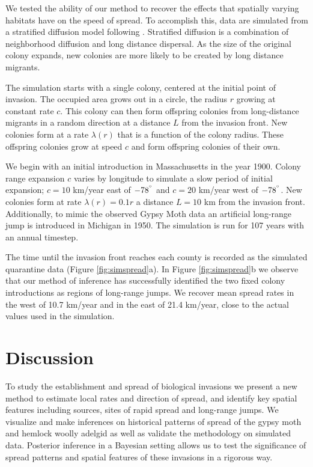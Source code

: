 \documentclass[12pt]{article}
\begin{document}
We tested the ability of our method to recover the effects that spatially varying habitats have on the speed of spread. To accomplish this, data are simulated from a stratified diffusion model following \cite{shigesada1995}. Stratified diffusion is a combination of neighborhood diffusion and long distance dispersal. As the size of the original colony expands, new colonies are more likely to be created by long distance migrants.

The simulation starts with a single colony, centered at the initial point of invasion. The occupied area grows out in a circle, the radius $r$ growing at constant rate $c$. This colony can then form offspring colonies from long-distance migrants in a random direction at a distance $L$ from the invasion front. New colonies form at a rate $\lambda(r)$ that is a function of the colony radius. These offspring colonies grow at speed $c$ and form offspring colonies of their own.

We begin with an initial introduction in Massachusetts in the year 1900. Colony range expansion $c$ varies by longitude to simulate a slow period of initial expansion; $c=10$ km/year east of $-78^{\degree}$ and $c=20$ km/year west of $-78^{\degree}$. New colonies form at rate $\lambda(r) = 0.1 r$ a distance $L=10$ km from the invasion front. Additionally, to mimic the observed Gypsy Moth data an artificial long-range jump is introduced in Michigan in 1950. The simulation is run for 107 years with an annual timestep.

The time until the invasion front reaches each county is recorded as the simulated quarantine data (Figure \ref{fig:simspread}a). In Figure \ref{fig:simspread}b we observe that our method of inference has successfully identified the two fixed colony introductions as regions of long-range jumps. We recover mean spread rates in the west of 10.7 km/year and in the east of 21.4 km/year, close to the actual values used in the simulation.


\section{Discussion}\label{sec:discussion}

To study the establishment and spread of biological invasions we present a new method to estimate local rates and direction of spread, and identify key spatial features including sources, sites of rapid spread and long-range jumps. We visualize and make inferences on historical patterns of spread of the gypsy moth and hemlock woolly adelgid as well as validate the methodology on simulated data. Posterior inference in a Bayesian setting allows us to test the significance of spread patterns and spatial features of these invasions in a rigorous way.
\end{document}
